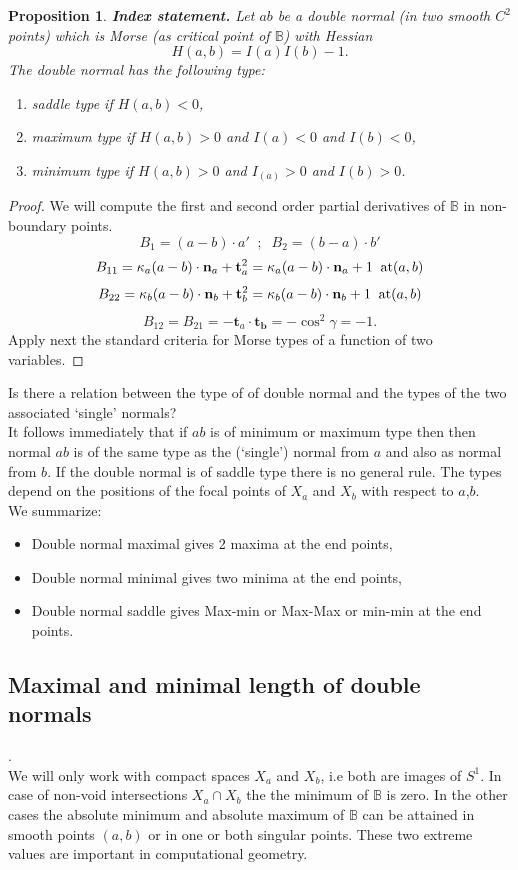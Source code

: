 \documentclass[12pt,a4,twoside]{amsart}
\newtheorem{prop}{Proposition}
\newtheorem*{main lemma}{The main lemma}
\begin{document}
\begin{prop}
{\bf Index statement.}
Let $ab$ be a double normal (in two smooth $C^2$ points) which is Morse (as critical point of $\mathbb{B}$) with Hessian
$$ H(a,b) =  I(a) I(b) - 1. $$ The  double normal has the following type:
\begin{enumerate}
\item saddle type if  $H(a,b) < 0$,
\item maximum type if $H(a,b) > 0$ and  $I(a)< 0$ and $I(b) < 0 $,
\item minimum type if $H(a,b) > 0$ and  $I_(a) > 0$ and $I(b) > 0 $.
\end{enumerate}
\end{prop}
\begin{proof}
 We will compute the first and second order partial derivatives of $\mathbb{B}$ in non-boundary points.
 $$ B_1 = (a-b) \cdot  a'\; \; ; \; \; B_2 =(b-a )\cdot b'   $$ 
$$ B_{11} = \kappa_a (a-b )\cdot \mathbf{n}_a +\mathbf{ t}_a^2 = \kappa_a (a-b) \cdot \mathbf{n}_a  +1 \; \; \mbox{\rm at} (a,b)  $$
$$ B_{22} = \kappa_b (a - b )\cdot \mathbf{n}_b +\mathbf{ t}_b^2 = \kappa_b(a-b) \cdot \mathbf{n}_b  +1 \; \; \mbox{\rm at} (a,b) $$
$$ B_{12}=B_{21} = - \mathbf{t}_a \cdot \mathbf{t_b}= - \cos^2 \gamma = -1.$$
Apply next the standard criteria for Morse types of a function of two variables.
\end{proof}

Is there a relation between the type of of double normal  and the types of the two associated `single' normals? \\
It follows immediately that if $ab$ is of minimum or maximum type then then normal $ab$   is of the same type as the (`single') normal from $a$ and also as normal from $b$.  If the double normal is of saddle type there is no general rule.
The types depend on the positions of the focal points of $X_a$ and $X_b$ with respect to $a$,$b$.\\
We summarize:


\begin{itemize}
\item   Double normal maximal     gives 2 maxima at the end points,
\item  Double normal minimal     gives two minima at the end points,
\item Double normal saddle       gives Max-min or Max-Max or min-min at the end points.
\end{itemize}



\subsection{Maximal and minimal length of double normals}.\\
We will only work with compact spaces $X_a$ and $X_b$, i.e both are images of $S^1$.
In case of non-void  intersections $X_a \cap X_b$ the the minimum of $ \mathbb{B}$ is zero.
In the other cases the absolute minimum and absolute maximum of $\mathbb{B}$ can be attained in smooth points $(a,b)$ or in one or both singular points.
These two extreme values are important in computational geometry.
\end{document}
